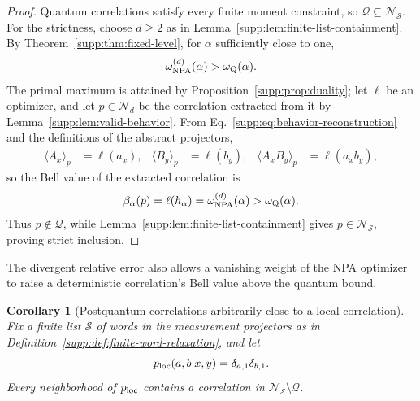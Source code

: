 \documentclass[aps,prl,onecolumn,10pt,superscriptaddress,nofootinbib,longbibliography]{revtex4-2}
\newtheorem{corollary}[theorem]{Corollary}
\theoremstyle{remark}
\newcommand{\Q}{\mathcal Q}
\begin{document}
\begin{proof}
Quantum correlations satisfy every finite moment constraint, so $\Q\subseteq\mathcal N_{\mathcal S}$. For the strictness, choose $d\geq2$ as in Lemma~\ref{supp:lem:finite-list-containment}. By Theorem~\ref{supp:thm:fixed-level}, for $\alpha$ sufficiently close to one,
\begin{equation}
\omega_{\rm NPA}^{(d)}(\alpha)>\omega_{\rm Q}(\alpha).
\label{supp:eq:strict-value-gap}
\end{equation}
The primal maximum is attained by Proposition~\ref{supp:prop:duality}; let $\ell$ be an optimizer, and let $p\in\mathcal N_d$ be the correlation extracted from it by Lemma~\ref{supp:lem:valid-behavior}. From Eq.~\eqref{supp:eq:behavior-reconstruction} and the definitions of the abstract projectors,
\begin{align}
\langle A_x\rangle_p&=\ell(a_x),
&\langle B_y\rangle_p&=\ell(b_y),
&\langle A_xB_y\rangle_p&=\ell(a_xb_y),
\label{supp:eq:moment-behavior-identity}
\end{align}
so the Bell value of the extracted correlation is
\begin{equation}
\beta_\alpha(p)=\ell(h_\alpha)=\omega_{\rm NPA}^{(d)}(\alpha)>\omega_{\rm Q}(\alpha).
\label{supp:eq:Bell-value-identity}
\end{equation}
Thus $p\notin\Q$, while Lemma~\ref{supp:lem:finite-list-containment} gives $p\in\mathcal N_{\mathcal S}$, proving strict inclusion.
\end{proof}

The divergent relative error also allows a vanishing weight of the NPA optimizer to raise a deterministic correlation's Bell value above the quantum bound.

\begin{corollary}[Postquantum correlations arbitrarily close to a local correlation]
\label{supp:cor:local-accumulation}
Fix a finite list $\mathcal S$ of words in the measurement projectors as in Definition~\ref{supp:def:finite-word-relaxation}, and let
\begin{equation}
p_{\rm loc}(a,b|x,y)=\delta_{a,1}\delta_{b,1}.
\label{supp:eq:local-deterministic-behavior}
\end{equation}
Every neighborhood of $p_{\rm loc}$ contains a correlation in $\mathcal N_{\mathcal S}\setminus\Q$.
\end{corollary}
\end{document}
